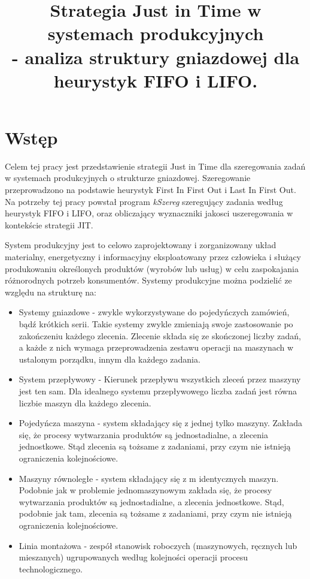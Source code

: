 \documentclass[twoside]{pracaInzynierskaMS}
\title{Strategia Just in Time w systemach produkcyjnych\\ - analiza struktury gniazdowej dla heurystyk FIFO i LIFO.}
\begin{document}
\section        {Wstęp}
Celem tej pracy jest przedstawienie strategii Just in Time dla szeregowania zadań w systemach produkcyjnych o strukturze gniazdowej. Szeregowanie przeprowadzono na podstawie heurystyk First In First Out i Last In First Out. Na potrzeby tej pracy powstał program \emph{kSzereg} szeregujący zadania według heurystyk FIFO i LIFO, oraz obliczający wyznaczniki jakosci uszeregowania w kontekście strategii JIT.

System produkcyjny jest to celowo zaprojektowany i zorganizowany układ materialny, energetyczny i informacyjny eksploatowany przez człowieka i służący produkowaniu określonych produktów (wyrobów lub usług) w celu zaspokajania różnorodnych potrzeb konsumentów. \cite{pastuszak}
Systemy produkcyjne można podzielić ze względu na strukturę na:
\begin{itemize}
\item Systemy gniazdowe - zwykle wykorzystywane do pojedyńczych zamówień, bądź krótkich serii. Takie systemy zwykle zmieniają swoje zastosowanie po zakończeniu każdego zlecenia. Zlecenie składa się ze skończonej liczby zadań, a każde z nich wymaga przeprowadzenia zestawu operacji na maszynach w ustalonym porządku, innym dla każdego zadania.
\item System przepływowy - Kierunek przepływu wszystkich zleceń przez maszyny jest ten sam. Dla idealnego systemu przepływowego liczba zadań jest równa liczbie maszyn dla każdego zlecenia. \cite{flowshop}
\item Pojedyńcza maszyna - system składający się z jednej tylko maszyny. Zakłada się, że procesy wytwarzania produktów są jednostadialne, a zlecenia jednostkowe. Stąd zlecenia są tożsame z zadaniami, przy czym nie istnieją ograniczenia kolejnościowe. \cite{single}
\item Maszyny równoległe - system składający się z m identycznych maszyn. Podobnie jak w problemie jednomaszynowym zakłada się, że procesy wytwarzania produktów są jednostadialne, a zlecenia jednostkowe. Stąd, podobnie jak tam, zlecenia są tożsame z zadaniami, przy czym nie istnieją ograniczenia kolejnościowe. \cite{paralel}
\item Linia montażowa -  zespół stanowisk roboczych (maszynowych, ręcznych lub mieszanych) ugrupowanych według kolejności operacji procesu technologicznego. \cite{wiki}
\end{itemize}
\end{document}
